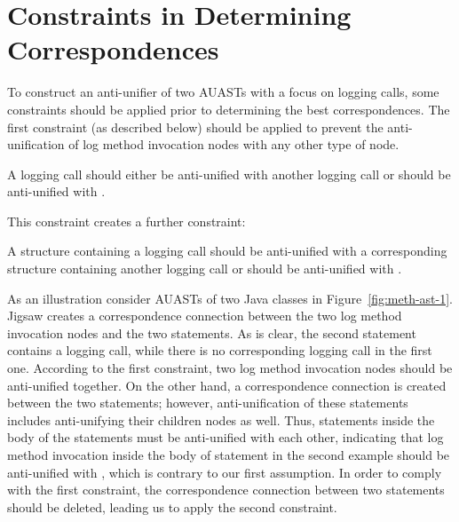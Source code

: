 
\section{Constraints in Determining Correspondences}  \label{meth-constraints}
To construct an anti-unifier of two AUASTs with a focus on logging calls, some constraints should be applied prior to determining the best correspondences. The first constraint (as described below) should be applied to prevent the anti-unification of log method invocation nodes with any other type of node.
\begin{constraint}
A logging call should either be anti-unified with another logging call or should be anti-unified with \nothing.
\end{constraint}	
	
This constraint creates a further constraint:

\begin{constraint}
A structure containing a logging call should be anti-unified with a corresponding structure containing another logging call or should be anti-unified with \nothing.
\end{constraint}

As an illustration consider AUASTs of two Java classes in Figure~\ref{fig:meth-ast-1}. Jigsaw creates a correspondence connection between the two log method invocation nodes and the two  statements. As is clear, the second  statement contains a logging call, while there is no corresponding logging call in the first one. According to the first constraint, two log method invocation nodes should be anti-unified together. On the other hand, a correspondence connection is created between the two  statements; however, anti-unification of these statements includes anti-unifying their children nodes as well. Thus, statements inside the body of the  statements must be anti-unified with each other, indicating that log method invocation inside the body of  statement in the second example should be anti-unified with \nothing, which is contrary to our first assumption. In order to comply with the first constraint, the correspondence connection between two  statements should be deleted, leading us to apply the second constraint.

